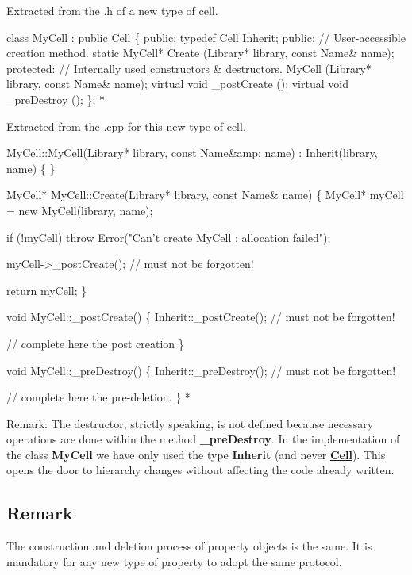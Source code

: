 Extracted from the .h of a new type of cell. 
\begin{DoxyCode}
\textcolor{keyword}{class }MyCell : \textcolor{keyword}{public} Cell \{
  \textcolor{keyword}{public}:  
    \textcolor{keyword}{typedef}  Cell  Inherit;
  \textcolor{keyword}{public}:
    \textcolor{comment}{// User-accessible creation method.}
    \textcolor{keyword}{static}  MyCell* Create      (Library* library, \textcolor{keyword}{const} Name& name);
  \textcolor{keyword}{protected}:
    \textcolor{comment}{// Internally used constructors & destructors. }
                    MyCell      (Library* library, \textcolor{keyword}{const} Name& name);
    \textcolor{keyword}{virtual} \textcolor{keywordtype}{void}    \_postCreate ();
    \textcolor{keyword}{virtual} \textcolor{keywordtype}{void}    \_preDestroy ();
\};
 *  
\end{DoxyCode}
 Extracted from the .cpp for this new type of cell. 
\begin{DoxyCode}
MyCell::MyCell(Library* library, \textcolor{keyword}{const} Name&amp; name)
  : Inherit(library, name)
\{ \}
 

MyCell* MyCell::Create(Library* library, \textcolor{keyword}{const} Name& name)
\{
  MyCell* myCell = \textcolor{keyword}{new} MyCell(library, name);
 
  \textcolor{keywordflow}{if} (!myCell) \textcolor{keywordflow}{throw} Error(\textcolor{stringliteral}{"Can't create MyCell : allocation failed"});
 
  myCell->\_postCreate(); \textcolor{comment}{// must not be forgotten!}
 
  \textcolor{keywordflow}{return} myCell;
\}
 

\textcolor{keywordtype}{void}  MyCell::\_postCreate()
\{
   Inherit::\_postCreate(); \textcolor{comment}{// must not be forgotten!}
 
   \textcolor{comment}{// complete here the post creation}
\}
 

\textcolor{keywordtype}{void}  MyCell::\_preDestroy()
\{
   Inherit::\_preDestroy(); \textcolor{comment}{// must not be forgotten!}
 
   \textcolor{comment}{// complete here the pre-deletion.}
\}
 *  
\end{DoxyCode}


\begin{DoxyParagraph}{Remark\-:}
The destructor, strictly speaking, is not defined because necessary operations are done within the method {\bfseries \-\_\-pre\-Destroy}. In the implementation of the class {\bfseries My\-Cell} we have only used the type {\bfseries Inherit} (and never {\bfseries \hyperlink{classHurricane_1_1Cell}{Cell}}). This opens the door to hierarchy changes without affecting the code already written.
\end{DoxyParagraph}
\hypertarget{classHurricane_1_1DBo_sDBoRemark}{}\subsection{Remark}\label{classHurricane_1_1DBo_sDBoRemark}
The construction and deletion process of property objects is the same. It is mandatory for any new type of property to adopt the same protocol. 

